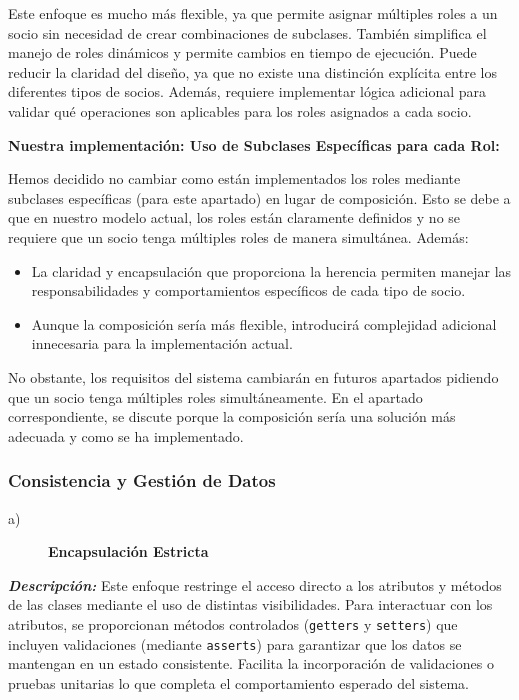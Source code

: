 Este enfoque es mucho más flexible, ya que permite asignar múltiples roles a un socio 
sin necesidad de crear combinaciones de subclases. También simplifica el manejo de 
roles dinámicos y permite cambios en tiempo de ejecución.
Puede reducir la claridad del diseño, ya que no existe una distinción explícita entre 
los diferentes tipos de socios. Además, requiere implementar lógica adicional para 
validar qué operaciones son aplicables para los roles asignados a cada socio.\par
\vspace{0.15cm}


\textbf{Nuestra implementación: Uso de Subclases Específicas para cada Rol:}\par  
\vspace{0.15cm}
Hemos decidido no cambiar como están implementados los roles mediante subclases específicas 
(para este apartado) en lugar de composición. Esto se debe a que en nuestro modelo actual, 
los roles están claramente definidos y no se requiere que un socio tenga múltiples roles de 
manera simultánea. Además:
\begin{itemize}
    \item La claridad y encapsulación que proporciona la herencia permiten manejar las responsabilidades y comportamientos específicos de cada tipo de socio.
    \item Aunque la composición sería más flexible, introducirá complejidad adicional innecesaria para la implementación actual.
\end{itemize}

No obstante, los requisitos del sistema cambiarán en futuros apartados pidiendo que un socio
tenga múltiples roles simultáneamente. En el apartado correspondiente, se discute porque 
la composición sería una solución más adecuada y como se ha implementado.




\subsubsection{Consistencia y Gestión de Datos}\label{page:Consistencia y Gestión de Datos}

\begin{description}
    \item[a)] \textbf{Encapsulación Estricta}
\end{description}

\textit{\textbf{Descripción:}}  
Este enfoque restringe el acceso directo a los atributos y métodos de las clases mediante 
el uso de distintas visibilidades. Para interactuar con los atributos, se proporcionan métodos 
 controlados (\texttt{getters} y \texttt{setters}) que incluyen validaciones (mediante 
\texttt{asserts}) para garantizar que los datos se mantengan en un estado consistente.
Facilita la incorporación de validaciones o pruebas unitarias lo que completa el comportamiento
esperado del sistema. 
\vspace{0.15cm}


